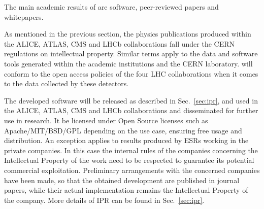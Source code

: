 The main academic results of \acronym are software, peer-reviewed papers and whitepapers. 

As mentioned in the previous section, the physics publications produced within the ALICE, ATLAS, CMS and LHCb collaborations fall under the CERN regulations on intellectual
property. 
Similar terms apply to the data and software tools generated within the academic institutions and the CERN laboratory. 
\acronym will conform to the open access policies of the four LHC collaborations when it comes to the data collected by these detectors. 

The developed software will be released as described in Sec.~\ref{sec:ipr}, and used in the ALICE, ATLAS, CMS and LHCb collaborations and disseminated for further use in research.
It be licensed under Open Source licenses such as Apache/MIT/BSD/GPL depending on the use case, ensuring free usage and distribution. 
An exception applies to results produced by ESRs working in the private companies. 
In this case the internal rules of the  companies concerning the Intellectual Property of the work need to be respected to guarantee its potential commercial  exploitation.
Preliminary arrangements with the concerned companies have been made, so that the obtained development are published in journal papers, while their actual implementation remains the Intellectual Property of the company. More details of IPR can be found in Sec.~\ref{sec:ipr}.

